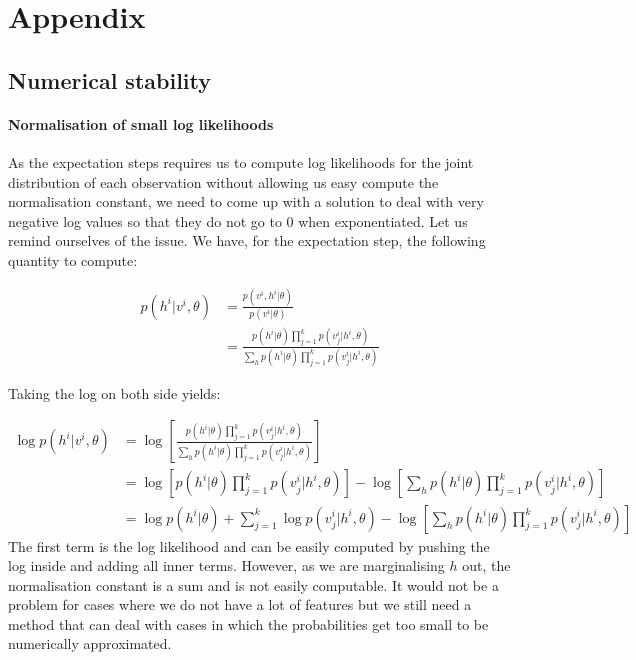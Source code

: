 \documentclass[]{article}
\begin{document}
\section{Appendix}

\subsection{Numerical stability}

\paragraph{Normalisation of small log likelihoods}

As the expectation steps requires us to compute log likelihoods for the joint distribution of each observation without allowing us easy compute the normalisation constant, we need to come up with a solution to deal with very negative log values so that they do not go to 0 when exponentiated. Let us remind ourselves of the issue. We have, for the expectation step, the following quantity to compute:

\begin{align*}
	p(h^i|v^i,\theta) &= \frac{p(v^i,h^i|\theta)}{p(v^i|\theta)} \\
	&= \frac{p(h^i|\theta) \prod_{j=1}^{k} p(v_j^i|h^i, \theta)}{\sum_{h}p(h^i|\theta) \prod_{j=1}^{k} p(v_j^i|h^i, \theta)}
\end{align*}

Taking the log on both side yields:

\begin{align*}
	\log p(h^i|v^i,\theta) &= \log \left[ \frac{p(h^i|\theta) \prod_{j=1}^{k} p(v_j^i|h^i, \theta)}{\sum_{h}p(h^i|\theta) \prod_{j=1}^{k} p(v_j^i|h^i, \theta)} \right] \\
	&= \log \left[ p(h^i|\theta) \prod_{j=1}^{k} p(v_j^i|h^i, \theta) \right] - \log \left[ \sum_{h}p(h^i|\theta) \prod_{j=1}^{k} p(v_j^i|h^i, \theta) \right]  \\
	&= \log p(h^i|\theta) + \sum_{j=1}^{k} \log p(v_j^i|h^i, \theta) - \log \left[ \sum_{h}p(h^i|\theta) \prod_{j=1}^{k} p(v_j^i|h^i, \theta) \right]  
\end{align*}
The first term is the log likelihood and can be easily computed by pushing the log inside and adding all inner terms. However, as we are marginalising $h$ out, the normalisation constant is a sum and is not easily computable. It would not be a problem for cases where we do not have a lot of features but we still need a method that can deal with cases in which the probabilities get too small to be numerically approximated. 
\end{document}
